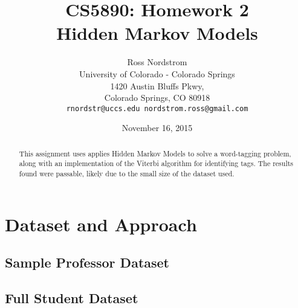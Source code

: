 \documentclass[11pt]{article}
\title{CS5890: Homework 2 \\ Hidden Markov Models}
\author{Ross Nordstrom \\
  University of Colorado - Colorado Springs \\
  1420 Austin Bluffs Pkwy, \\
  Colorado Springs, CO 80918 \\
  {\tt rnordstr@uccs.edu nordstrom.ross@gmail.com} \\}
\date{November 16, 2015}
\begin{document}
\maketitle
\begin{abstract}
This assignment uses applies Hidden Markov Models to solve a word-tagging problem, along with an implementation
of the Viterbi algorithm for identifying tags. The results found were passable, likely due to the small size of the
dataset used.
\end{abstract}

\section{Dataset and Approach}

\subsection{Sample Professor Dataset}

\subsection{Full Student Dataset}
\end{document}
